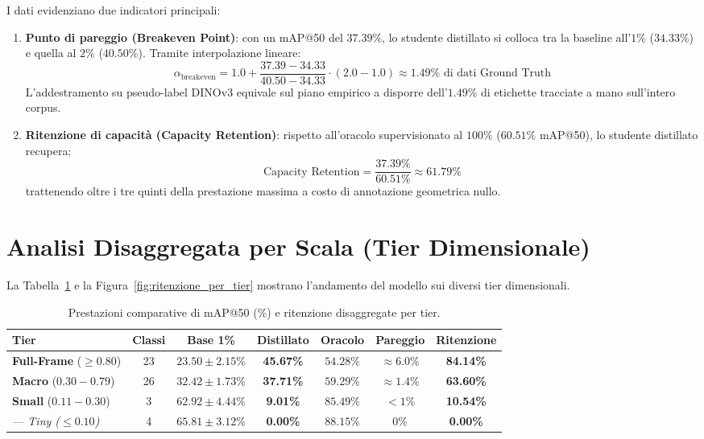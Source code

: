 I dati evidenziano due indicatori principali:
\begin{enumerate}
    \item \textbf{Punto di pareggio (Breakeven Point)}: con un mAP@50 del $37.39\%$, lo studente distillato si colloca tra la baseline all'$1\%$ ($34.33\%$) e quella al $2\%$ ($40.50\%$). Tramite interpolazione lineare:
    \begin{equation}
        \alpha_{\text{breakeven}} = 1.0 + \frac{37.39 - 34.33}{40.50 - 34.33} \cdot (2.0 - 1.0) \approx 1.49\% \text{ di dati Ground Truth}
    \end{equation}
    L'addestramento su pseudo-label DINOv3 equivale sul piano empirico a disporre dell'$1.49\%$ di etichette tracciate a mano sull'intero corpus.
    \item \textbf{Ritenzione di capacità (Capacity Retention)}: rispetto all'oracolo supervisionato al $100\%$ ($60.51\%$ mAP@50), lo studente distillato recupera:
    \begin{equation}
        \text{Capacity Retention} = \frac{37.39\%}{60.51\%} \approx 61.79\%
    \end{equation}
    trattenendo oltre i tre quinti della prestazione massima a costo di annotazione geometrica nullo.
\end{enumerate}

\section{Analisi Disaggregata per Scala (Tier Dimensionale)}
\label{sec:ris_tier}
La Tabella~\ref{tab:risultati_tier} e la Figura~\ref{fig:ritenzione_per_tier} mostrano l'andamento del modello sui diversi tier dimensionali.

\begin{table}[htbp]
\centering
\footnotesize
\setlength{\tabcolsep}{3pt}
\begin{tabular*}{\textwidth}{@{\extracolsep{\fill}}lcccccc}
\toprule
\textbf{Tier} & \textbf{Classi} & \textbf{Base 1\%} & \textbf{Distillato} & \textbf{Oracolo} & \textbf{Pareggio} & \textbf{Ritenzione} \\
\midrule
\textbf{Full-Frame} ($\ge 0.80$) & 23 & $23.50 \pm 2.15\%$ & \textbf{45.67\%} & $54.28\%$ & \textbf{$\approx 6.0\%$} & \textbf{84.14\%} \\
\textbf{Macro} ($0.30 - 0.79$) & 26 & $32.42 \pm 1.73\%$ & \textbf{37.71\%} & $59.29\%$ & \textbf{$\approx 1.4\%$} & \textbf{63.60\%} \\
\textbf{Small} ($0.11 - 0.30$) & 3 & $62.92 \pm 4.44\%$ & \textbf{9.01\%} & $85.49\%$ & $< 1\%$ & \textbf{10.54\%} \\
\textit{— Tiny ($\le 0.10$)} & 4 & $65.81 \pm 3.12\%$ & \textbf{0.00\%} & $88.15\%$ & $0\%$ & \textbf{0.00\%} \\
\bottomrule
\end{tabular*}
\caption{Prestazioni comparative di mAP@50 (\%) e ritenzione disaggregate per tier.}
\label{tab:risultati_tier}
\end{table}

